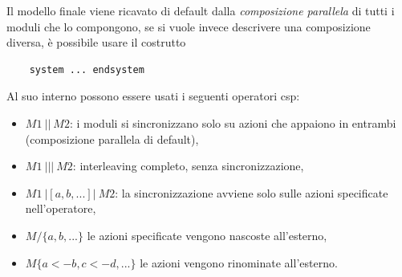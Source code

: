 Il modello finale viene ricavato di default dalla \emph{composizione parallela} di tutti i moduli che lo compongono, se si vuole invece descrivere una composizione diversa, è possibile usare il costrutto
\begin{verbatim}
	system ... endsystem
\end{verbatim}
Al suo interno possono essere usati i seguenti operatori \ac{csp}:
\begin{itemize}
	\item $M1\ ||\ M2$: i moduli si sincronizzano solo su azioni che appaiono in entrambi (composizione parallela di default),
	\item $M1\ |||\ M2$: interleaving completo, senza sincronizzazione,
	\item $M1\ |[a,b,...]|\ M2$: la sincronizzazione avviene solo sulle azioni specificate nell'operatore,
	\item $M \slash \{a,b,...\}$ le azioni specificate vengono nascoste all'esterno,
	\item $M \{a<-b,c<-d,...\}$ le azioni vengono rinominate all'esterno.
\end{itemize}



